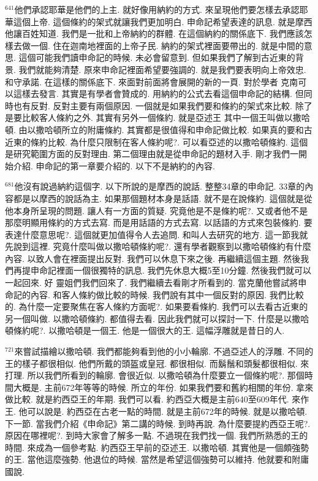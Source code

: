 \documentclass{book}
\begin{document}
$^{641}$他們承認耶華是他們的上主.
就好像用納約的方式.
來呈現他們要怎樣去承認耶華這個上帝.
這個條約的架式就讓我們更加明白.
申命記希望表達的訊息.
就是摩西他讓百姓知道.
我們是一批和上帝納約的群體.
在這個納約的關係底下.
我們應該怎樣去做一個.
住在迦南地裡面的上帝子民.
納約的架式裡面要帶出的.
就是中間的意思.
這個可能我們讀申命記的時候.
未必會留意到.
但如果我們了解到古近東的背景.
我們就能夠清楚.
原來申命記裡面希望要強調的.
就是我們要表明向上帝效忠.
和守承諾.
在這樣的關係底下.
來面對前面將會展開的新的一頁.
對於學者 克南可以這樣去發言.
其實是有學者會贊成的.
用納約的公式去看這個申命記的結構.
但同時也有反對.
反對主要有兩個原因.
一個就是如果我們要和條約的架式來比較.
除了是要比較客人條約之外.
其實有另外一個條約.
就是亞述王 其中一個王叫做以撒哈頓.
由以撒哈頓所立的附庸條約.
其實都是很值得和申命記做比較.
如果真的要和古近東的條約比較.
為什麼只限制在客人條約呢?.
可以看亞述的以撒哈頓條約.
這個是研究範圍方面的反對理由.
第二個理由就是從申命記的題材入手.
剛才我們一開始介紹.
申命記的第一章要介紹的.
以下不是納約的內容.

$^{681}$他沒有說過納約這個字.
以下所說的是摩西的說話.
整整34章的申命記.
33章的內容都是以摩西的說話為主.
如果那個題材本身是話語.
就不是在說條約.
這個就是從他本身所呈現的問題.
讓人有一方面的質疑.
究竟他是不是條約呢?.
又或者他不是那麼明顯用條約的方式去寫.
而是用話語的方式去寫.
以話語的方式來包裝條約.
要表達什麼意思呢?.
這個就更加值得令人去追問.
和叫人去研究的地方.
這一節我就先說到這裡.
究竟什麼叫做以撒哈頓條約呢?.
還有學者觀察到以撒哈頓條約有什麼內容.
以致人會在裡面提出反對.
我們可以休息下來之後.
再繼續這個主題.
然後我們再提申命記裡面一個很獨特的訊息.
我們先休息大概5至10分鐘.
然後我們就可以一起回來.
好 靈姐們我們回來了.
我們繼續去看剛才所看到的.
當克蘭他嘗試將申命記的內容.
和客人條約做比較的時候.
我們說有其中一個反對的原因.
我們比較的.
為什麼一定要聚焦在客人條約方面呢?.
如果要看條約.
我們可以去看古近東的另一個叫做.
以撒哈頓條約.
都值得去看.
因此我們就可以探討一下.
什麼是以撒哈頓條約呢?.
以撒哈頓是一個王.
他是一個很大的王.
這幅浮雕就是昔日的人.

$^{721}$來嘗試描繪以撒哈頓.
我們都能夠看到他的小小輪廓.
不過亞述人的浮雕.
不同的王的樣子都很相似.
他們所戴的頭盔或皇冠.
都很相似.
而鬍鬚和頭髮都很相似.
來打理.
所以我們所看到的輪廓.
會很近似.
以撒哈頓為什麼要立一個條約呢?.
那個時間大概是.
主前672年等等的時候.
所立的年份.
如果我們要和舊約相關的年份.
拿來做比較.
就是約西亞王的年期.
我們可以看.
約西亞大概是主前640至609年代.
來作王.
他可以說是.
約西亞在古老一點的時間.
就是主前672年的時候.
就是以撒哈頓.
下一節.
當我們介紹《申命記》第二講的時候.
到時再說.
為什麼要提約西亞王呢?.
原因在哪裡呢?.
到時大家會了解多一點.
不過現在我們找一個.
我們所熟悉的王的時間.
來成為一個參考點.
約西亞王早前的亞述王.
以撒哈頓.
其實他是一個頗強勢的王.
當他這麼強勢.
他退位的時候.
當然是希望這個強勢可以維持.
他就要和附庸國說.
\end{document}
